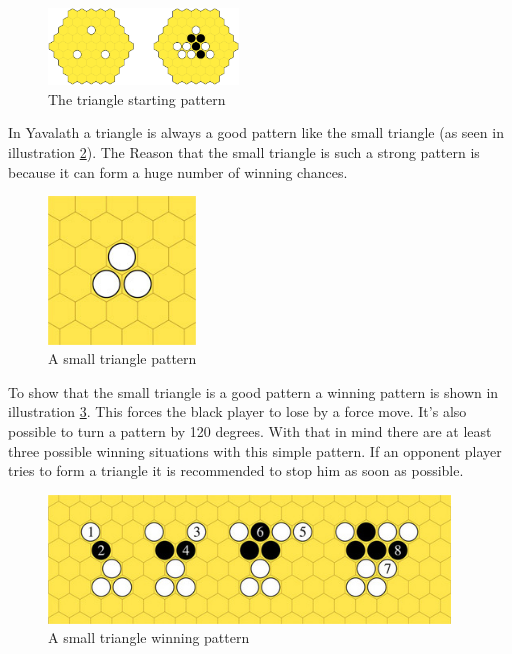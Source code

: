\documentclass[english]{report}
\begin{document}
\begin{figure}[H]
\centering
\includegraphics[width=0.45\textwidth]{Abbildungen/yav_triangle.png}
\caption[The triangle starting pattern, Source:\cite{yvalath}]{The triangle starting pattern}
\label{fig:yav_triangle}
\end{figure}

In Yavalath a triangle is always a good pattern like the small triangle (as seen in illustration \ref{fig:yav_smallTriangle}). The Reason that the small triangle is such a strong pattern is because it can form a huge number of winning chances. 


\begin{figure}[H]
\centering
\includegraphics[width=0.35\textwidth]{Abbildungen/yav_smallTriangle.png}
\caption[A small triangle pattern, Source:\cite{yvalathBGG}]{A small triangle pattern}
\label{fig:yav_smallTriangle}
\end{figure}

To show that the small triangle is a good pattern a winning pattern is shown in illustration \ref{fig:yav_smallTriangleWin1}. This forces the black player to lose by a force move. It's also possible to turn a pattern by 120 degrees. With that in mind there are at least three possible winning situations with this simple pattern. If an opponent player tries to form a triangle it is recommended to stop him as soon as possible.\cite{yvalathBGG}

\begin{figure}[H]
\centering
\includegraphics[width=0.95\textwidth]{Abbildungen/yav_smallTriangleWin1.png}
\caption[A small triangle winning pattern, Source:\cite{yvalathBGG}]{A small triangle winning pattern}
\label{fig:yav_smallTriangleWin1}
\end{figure}
\end{document}
